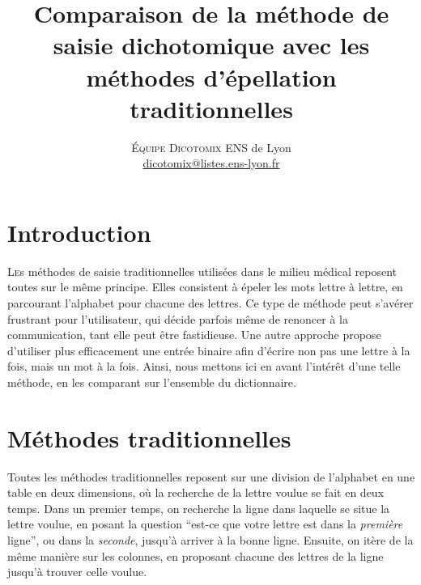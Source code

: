 \documentclass[twoside,twocolumn]{article}
\title{Comparaison de la méthode de saisie dichotomique avec les méthodes d'épellation traditionnelles} %
\author{%
\textsc{Équipe Dicotomix}
\normalsize ENS de Lyon \\ %
\normalsize \href{mailto:dicotomix@listes.ens-lyon.fr}{dicotomix@listes.ens-lyon.fr} %
}
\date{} %
\begin{document}
\maketitle


\section{Introduction}

\lettrine[nindent=0em,lines=3]{L}es méthodes de saisie traditionnelles utilisées dans le milieu médical reposent toutes sur le même principe. Elles consistent à épeler les mots lettre à lettre, en parcourant l'alphabet pour chacune des lettres. Ce type de méthode peut s'avérer frustrant pour l'utilisateur, qui décide parfois même de renoncer à la communication, tant elle peut être fastidieuse. Une autre approche propose d'utiliser plus efficacement une entrée binaire afin d'écrire non pas une lettre à la fois, mais un mot à la fois. Ainsi, nous mettons ici en avant l'intérêt d'une telle méthode, en les comparant sur l'ensemble du dictionnaire.


\section{Méthodes traditionnelles}

Toutes les méthodes traditionnelles reposent sur une division de l'alphabet en une table en deux dimensions, où la recherche de la lettre voulue se fait en deux temps. Dans un premier temps, on recherche la ligne dans laquelle se situe la lettre voulue, en posant la question ``est-ce que votre lettre est dans la \textit{première} ligne'', ou dans la \textit{seconde}, jusqu'à arriver à la bonne ligne. Ensuite, on itère de la même manière sur les colonnes, en proposant chacune des lettres de la ligne jusqu'à trouver celle voulue.
\end{document}
